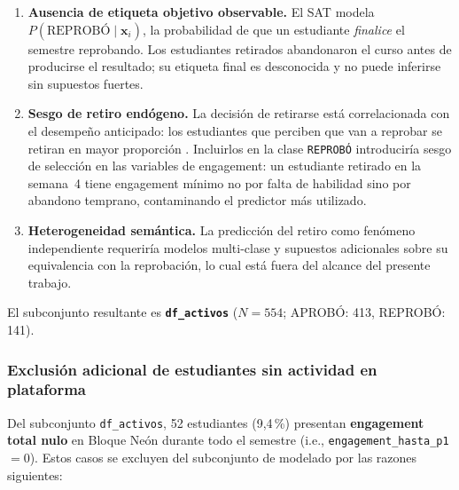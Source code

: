 \begin{enumerate}
  \item \textbf{Ausencia de etiqueta objetivo observable.}
    El SAT modela $P(\text{REPROBÓ} \mid \mathbf{x}_i)$, la
    probabilidad de que un estudiante \emph{finalice} el semestre
    reprobando. Los estudiantes retirados abandonaron el curso
    antes de producirse el resultado; su etiqueta final es
    desconocida y no puede inferirse sin supuestos fuertes.

  \item \textbf{Sesgo de retiro endógeno.}
    La decisión de retirarse está correlacionada con el
    desempeño anticipado: los estudiantes que perciben que van
    a reprobar se retiran en mayor proporción \cite{Tinto1993}.
    Incluirlos en la clase \texttt{REPROBÓ} introduciría sesgo
    de selección en las variables de engagement: un estudiante
    retirado en la semana~4 tiene engagement mínimo no por falta
    de habilidad sino por abandono temprano, contaminando el
    predictor más utilizado.

  \item \textbf{Heterogeneidad semántica.}
    La predicción del retiro como fenómeno independiente
    requeriría modelos multi-clase y supuestos adicionales
    sobre su equivalencia con la reprobación, lo cual está
    fuera del alcance del presente trabajo.
\end{enumerate}

El subconjunto resultante es \textbf{\texttt{df\_activos}}
($N = 554$; APROBÓ: 413, REPROBÓ: 141).

\subsubsection{Exclusión adicional de estudiantes sin actividad
               en plataforma}
\label{sssec:excl_engagement}

Del subconjunto \texttt{df\_activos}, 52 estudiantes (9,4\,\%)
presentan \textbf{engagement total nulo} en Bloque Neón durante
todo el semestre (i.e., \texttt{engagement\_hasta\_p1} $= 0$).
Estos casos se excluyen del subconjunto de modelado por las
razones siguientes:

